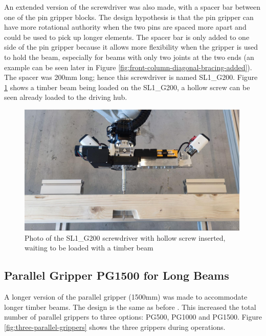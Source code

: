 An extended version of the screwdriver was also made, with a spacer bar between one of the pin gripper blocks. The design hypothesis is that the pin gripper can have more rotational authority when the two pins are spaced more apart and could be used to pick up longer elements. The spacer bar is only added to one side of the pin gripper because it allows more flexibility when the gripper is used to hold the beam, especially for beams with only two joints at the two ends (an example can be seen later in Figure \ref{fig:front-column-diagonal-bracing-added}).
The spacer was 200mm long; hence this screwdriver is named SL1\_G200. Figure \ref{fig:sl1-g200-screwdriver-with-a-timber-beam-loaded} shows a timber beam being loaded on the SL1\_G200, a hollow screw can be seen already loaded to the driving hub.

\begin{figure}[!h]
    \centering
    \includegraphics[width=0.99\textwidth]{images/7a/img56.jpg}
    \caption{Photo of the SL1\_G200 screwdriver with hollow screw inserted, waiting to be loaded with a timber beam}
    \label{fig:sl1-g200-screwdriver-with-a-timber-beam-loaded}
\end{figure}



\subsection{Parallel Gripper PG1500 for Long Beams}
\label{subsection:exploration-4-parallel-gripper-pg1500-for-long-beams}

A longer version of the parallel gripper (1500mm) was made to accommodate longer timber beams. The design is the same as before . This increased the total number of parallel grippers to three options: PG500, PG1000 and PG1500. Figure \ref{fig:three-parallel-grippers} shows the three grippers during operations.

